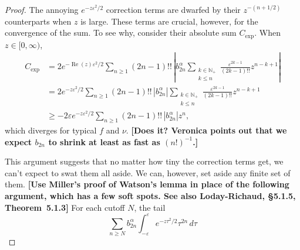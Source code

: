 \documentclass{article}
\begin{document}
\begin{proof}
The annoying $e^{-z\varepsilon^2/2}$ correction terms are dwarfed by their $z^{-(n+1/2)}$ counterparts when $z$ is large. These terms are crucial, however, for the convergence of the sum. To see why, consider their absolute sum $C_\text{exp}$. When $z \in [0, \infty)$,
\begin{align*}
C_\text{exp} & = 2e^{-\operatorname{Re}(z)\varepsilon^2/2} \sum_{n \ge 1} (2n-1)!!\,\left| b_{2n}^\alpha \sum_{\substack{k \in \mathbb{N}_+ \\ k \le n}} \frac{\varepsilon^{2k-1}}{(2k-1)!!} z^{n-k+1} \right| \\
& = 2e^{-z\varepsilon^2/2} \sum_{n \ge 1} (2n-1)!!\,\left|b_{2n}^\alpha\right| \sum_{\substack{k \in \mathbb{N}_+ \\ k \le n}} \frac{\varepsilon^{2k-1}}{(2k-1)!!} z^{n-k+1} \\
& \ge -2\varepsilon e^{-z\varepsilon^2/2} \sum_{n \ge 1} (2n-1)!!\,\left|b_{2n}^\alpha\right| z^n,
\end{align*}
which diverges for typical $f$ and $\nu$. \textbf{[Does it? Veronica points out that we expect $b_{2n}$ to shrink at least as fast as $(n!)^{-1}$.]}

This argument suggests that no matter how tiny the correction terms get, we can't expect to swat them all aside. We can, however, set aside any finite set of them. \color{violet}\textbf{[Use Miller's proof of Watson's lemma in place of the following argument, which has a few soft spots. See also Loday-Richaud, \S 5.1.5, Theorem~5.1.3]} For each cutoff $N$, the tail
\[ \sum_{n \ge N} b_{2n}^\alpha \int_{-\varepsilon}^\varepsilon e^{-z\tau^2/2} \tau^{2n}\,d\tau \]


\end{proof}
\end{document}
